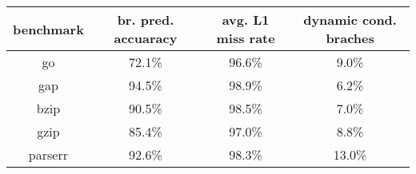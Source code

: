 \begin{tabular}{|c|c|c|c|}
\hline 
benchmark&
br. pred. accuaracy&
avg. L1 miss rate&
dynamic cond. braches\\
\hline
\hline 
go&
72.1\%&
96.6\%&
9.0\%\\
\hline 
gap&
94.5\%&
98.9\%&
6.2\%\\
\hline 
bzip&
90.5\%&
98.5\%&
7.0\%\\
\hline 
gzip&
85.4\%&
97.0\%&
8.8\%\\
\hline 
parserr&
92.6\%&
98.3\%&
13.0\%\\
\hline
\end{tabular}
